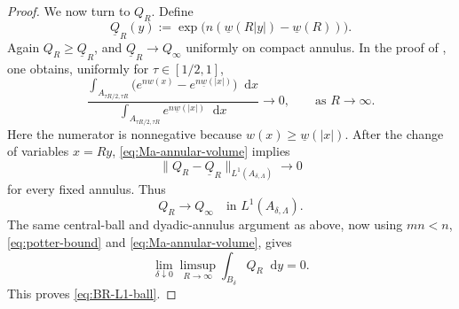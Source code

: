 \documentclass[10pt,a4paper]{amsart}
\numberwithin{equation}{section}
\newcommand{\dd}{\mathop{}\!\mathrm{d}}%
\begin{document}
\begin{proof}

We now turn to $Q_R$.  Define
\[
    \underline Q_R(y)
    :=\exp\bigl(n(\underline w(R|y|)-\underline w(R))\bigr).
\]
Again $Q_R\geq\underline Q_R$, and $\underline Q_R\to Q_\infty$
uniformly on compact annulus. In the proof of \cite[Page 25]{M}, one obtains, uniformly for
$\tau\in[1/2,1]$,
\begin{equation}\label{eq:Ma-annular-volume}
\frac{
\displaystyle
\int_{A_{\tau R/2,\tau R}}
\bigl(e^{nw(x)}-e^{n\underline w(|x|)}\bigr)\dd x
}{
\displaystyle
\int_{A_{\tau R/2,\tau R}}
 e^{n\underline w(|x|)}\dd x
}
\to 0, \qquad \text{as $R\to\infty $}.
\end{equation}
Here the numerator is nonnegative because
$w(x)\geq\underline w(|x|)$.  After the change of variables $x=Ry$,
\cref{eq:Ma-annular-volume} implies
\[
    \|Q_R-\underline Q_R\|_{L^1(A_{\delta,\Lambda})}
    \to0
\]
for every fixed annulus. Thus
\[
    Q_R\to Q_\infty
    \quad\text{in }L^1(A_{\delta,\Lambda}).
\]
The same central-ball and dyadic-annulus argument as above, now using
$mn<n$, \cref{eq:potter-bound} and \cref{eq:Ma-annular-volume}, gives
\[
    \lim_{\delta\downarrow0}
    \limsup_{R\to\infty}
    \int_{B_\delta}Q_R\dd y=0.
\]
This proves \cref{eq:BR-L1-ball}.


\end{proof}
\end{document}
